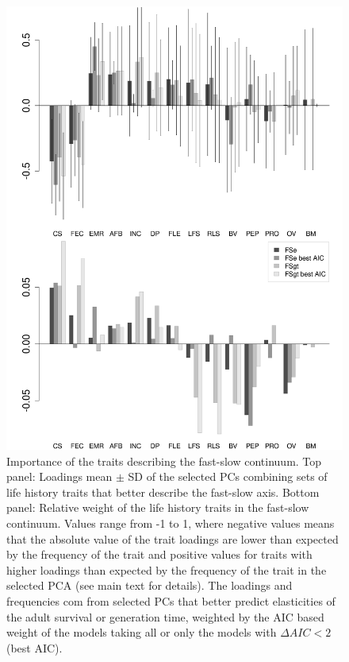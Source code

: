\begin{figure}
\centering
\includegraphics[width=\textwidth]{./Figures/chapter02/fig2-FSaxes.png}
\caption[Fast-Slow PC loadings]{
Importance of the traits describing the fast-slow continuum. Top panel: Loadings 
mean $\pm$ SD of the selected PCs combining sets of life history traits that 
better describe the fast-slow axis. Bottom panel: Relative weight of the life 
history traits in the fast-slow continuum. Values range from -1 to 1, where 
negative values means that the absolute value of the trait loadings are lower 
than expected by the frequency of the trait and positive values for traits with 
higher loadings than expected by the frequency of the trait in the selected 
PCA (see main text for details). The loadings and frequencies com from 
selected PCs that better predict elasticities of the adult survival or 
generation time, weighted by the AIC based weight of the models taking all or 
only the models with $\Delta AIC < 2$ (best AIC).}
\label{fig:fig2.2}
\end{figure}


